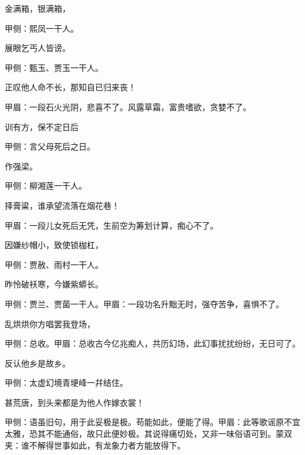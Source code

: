 \begin{poem}
    \begin{pl}金满箱，银满箱，\end{pl}\begin{note}甲侧：熙凤一干人。\end{note}

    \begin{pl}展眼乞丐人皆谤。\end{pl}\begin{note}甲侧：甄玉、贾玉一干人。\end{note}

    \begin{pl}正叹他人命不长，那知自已归来丧！\end{pl}\begin{note}甲眉：一段石火光阴，悲喜不了。风露草霜，富贵嗜欲，贪婪不了。\end{note}

    \begin{pl}训有方，保不定日后\end{pl}\begin{note}甲侧：言父母死后之日。\end{note}作强梁。\begin{note}甲侧：柳湘莲一干人。\end{note}

    \begin{pl}择膏粱，谁承望流落在烟花巷！\end{pl}\begin{note}甲眉：一段儿女死后无凭，生前空为筹划计算，痴心不了。\end{note}

    \begin{pl}因嫌纱帽小，致使锁枷杠，\end{pl}\begin{note}甲侧：贾赦、雨村一干人。\end{note}

    \begin{pl}昨怜破袄寒，今嫌紫蟒长。\end{pl}\begin{note}甲侧：贾兰、贾菌一干人。甲眉：一段功名升黜无时，强夺苦争，喜惧不了。\end{note}
    \begin{pl}乱烘烘你方唱罢我登场，\end{pl}\begin{note}甲侧：总收。甲眉：总收古今亿兆痴人，共历幻场，此幻事扰扰纷纷，无日可了。\end{note}

    \begin{pl}反认他乡是故乡。\end{pl}\begin{note}甲侧：太虚幻境青埂峰一幷结住。\end{note}

    \begin{pl}甚荒唐，到头来都是为他人作嫁衣裳！\end{pl}\begin{note}甲侧：语虽旧句，用于此妥极是极。苟能如此，便能了得。甲眉：此等歌谣原不宜太雅，恐其不能通俗，故只此便妙极。其说得痛切处，又非一味俗语可到。蒙双夹：谁不解得世事如此，有龙象力者方能放得下。\end{note}
\end{poem}


